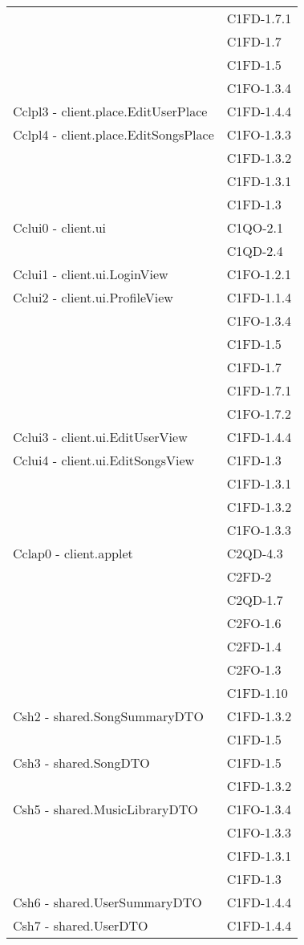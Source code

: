\begin{footnotesize}
\begin{longtable}[!h]{|l|l|}
& C1FD-1.7.1 \\
& C1FD-1.7 \\
& C1FD-1.5 \\
& C1FO-1.3.4 \\\hline
Cclpl3 - client.place.EditUserPlace & C1FD-1.4.4 \\\hline
Cclpl4 - client.place.EditSongsPlace & C1FO-1.3.3 \\
& C1FD-1.3.2 \\
& C1FD-1.3.1 \\
& C1FD-1.3 \\ \hline
Cclui0 - client.ui & C1QO-2.1 \\
& C1QD-2.4 \\\hline
Cclui1 - client.ui.LoginView & C1FO-1.2.1 \\\hline
Cclui2 - client.ui.ProfileView & C1FD-1.1.4 \\
& C1FO-1.3.4 \\
& C1FD-1.5 \\
& C1FD-1.7 \\
& C1FD-1.7.1 \\
& C1FO-1.7.2 \\\hline
Cclui3 - client.ui.EditUserView & C1FD-1.4.4 \\\hline
Cclui4 - client.ui.EditSongsView & C1FD-1.3 \\
& C1FD-1.3.1 \\
& C1FD-1.3.2 \\
& C1FO-1.3.3 \\\hline
Cclap0 - client.applet & C2QD-4.3 \\
& C2FD-2 \\
& C2QD-1.7 \\
& C2FO-1.6 \\
& C2FD-1.4 \\
& C2FO-1.3 \\\
& C1FD-1.10 \\\hline
Csh2 - shared.SongSummaryDTO & C1FD-1.3.2 \\
& C1FD-1.5 \\\hline
Csh3 - shared.SongDTO & C1FD-1.5 \\
& C1FD-1.3.2 \\\hline
Csh5 - shared.MusicLibraryDTO & C1FO-1.3.4 \\
& C1FO-1.3.3 \\
& C1FD-1.3.1 \\
& C1FD-1.3 \\\hline
Csh6 - shared.UserSummaryDTO & C1FD-1.4.4 \\\hline
Csh7 - shared.UserDTO & C1FD-1.4.4 \\\hline

\end{longtable}
\end{footnotesize}
